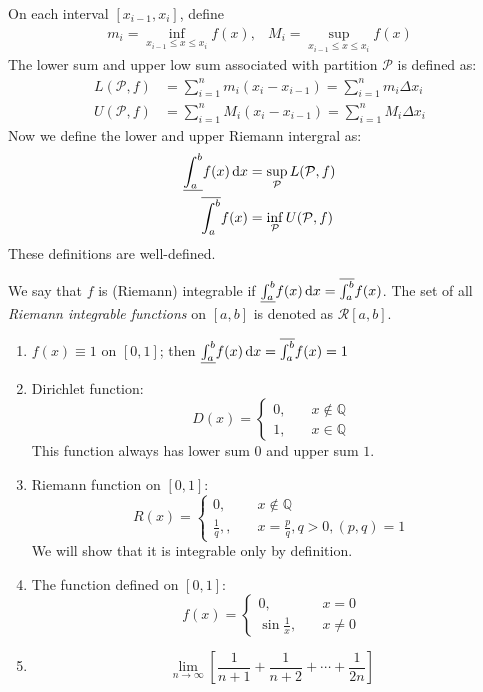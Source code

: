 On each interval $[x_{i-1},x_i]$, define 
\[
\begin{array}{ll}
m_i=\inf_{x_{i-1}\le x\le x_i}f(x),
&
M_i=\sup_{x_{i-1}\le x\le x_i}f(x)
\end{array}
\]
The lower sum and upper low sum associated with partition $\mathcal{P}$ is defined as:
\begin{align*}
L(\mathcal{P},f)&=\sum_{i=1}^{n} m_i(x_i - x_{i-1})
=\sum_{i=1}^n m_i\Delta x_i\\
U(\mathcal{P},f)&=\sum_{i=1}^{n} M_i(x_i - x_{i-1})
=\sum_{i=1}^n M_i\Delta x_i
\end{align*}
Now we define the lower and upper Riemann intergral as:
\begin{align*}
\underline{\int_{a}^{b}}f(x)\,\mathrm{d} x&=\sup_{\mathcal{P}}L(\mathcal{P},f)\\
\overline{\int_{a}^{b}}f(x)&=\inf_{\mathcal{P}}U(\mathcal{P},f)
\end{align*}
These definitions are well-defined.
\begin{definition}[integrable]
We say that $f$ is (Riemann) integrable if $\underline{\int_{a}^{b}}f(x)\,\mathrm{d} x=\overline{\int_{a}^{b}}f(x)$. The set of all \emph{Riemann integrable functions} on $[a,b]$ is denoted as $\mathcal{R}[a,b]$.
\end{definition}
\begin{example}
\begin{enumerate}
\item
$f(x)\equiv 1$ on $[0,1]$; then $\underline{\int_{a}^{b}}f(x)\,\mathrm{d} x=\overline{\int_{a}^{b}}f(x)=1$
\item
Dirichlet function:
\[
D(x)=\left\{
\begin{aligned}
0,&\quad x\notin\mathbb{Q}\\
1,&\quad x\in\mathbb{Q}
\end{aligned}
\right.
\]
This function always has lower sum $0$ and upper sum $1$.
\item
Riemann function on $[0,1]$:
\[
R(x)=\left\{
\begin{aligned}
0,&\quad x\notin\mathbb{Q}\\
\frac{1}{q},,&\quad x=\frac{p}{q}, q>0, (p,q)=1
\end{aligned}
\right.
\]
We will show that it is integrable only by definition.
\item
The function defined on $[0,1]$:
\[
f(x)=\left\{
\begin{aligned}
0,&\quad x=0\\
\sin\frac{1}{x},&\quad x\ne0
\end{aligned}
\right.
\]
\item
\[
\lim_{n\to\infty}\left[\frac{1}{n+1}+\frac{1}{n+2}+\cdots+\frac{1}{2n}\right]
\]
\end{enumerate}
\end{example}

